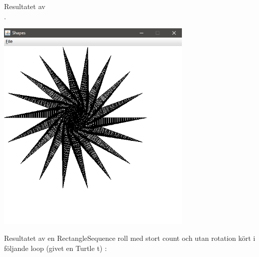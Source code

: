 Resultatet av\\
 .




\includegraphics[width=0.7\textwidth]{../img/w06-lab/RectangleSequence.png}

Resultatet av en RectangleSequence roll med stort count och utan rotation kört i följande loop (givet en Turtle t) :\\

